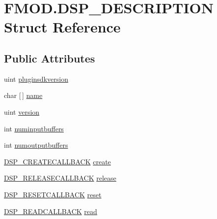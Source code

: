 \hypertarget{struct_f_m_o_d_1_1_d_s_p___d_e_s_c_r_i_p_t_i_o_n}{}\section{F\+M\+O\+D.\+D\+S\+P\+\_\+\+D\+E\+S\+C\+R\+I\+P\+T\+I\+ON Struct Reference}
\label{struct_f_m_o_d_1_1_d_s_p___d_e_s_c_r_i_p_t_i_o_n}
\subsection*{Public Attributes}
\begin{DoxyCompactItemize}
\item 
uint \hyperlink{struct_f_m_o_d_1_1_d_s_p___d_e_s_c_r_i_p_t_i_o_n_ae18fe37961911625380789a2cbbaa82e}{pluginsdkversion}
\item 
char \mbox{[}$\,$\mbox{]} \hyperlink{struct_f_m_o_d_1_1_d_s_p___d_e_s_c_r_i_p_t_i_o_n_abb3197420660275b62c87ee382edf71f}{name}
\item 
uint \hyperlink{struct_f_m_o_d_1_1_d_s_p___d_e_s_c_r_i_p_t_i_o_n_acde54019875ff8a337d7d990e5f72b7f}{version}
\item 
int \hyperlink{struct_f_m_o_d_1_1_d_s_p___d_e_s_c_r_i_p_t_i_o_n_ab402df2846d1fd1a5057a836b52565f9}{numinputbuffers}
\item 
int \hyperlink{struct_f_m_o_d_1_1_d_s_p___d_e_s_c_r_i_p_t_i_o_n_a22eb1dceedf976d48b52b0f4b4da612d}{numoutputbuffers}
\item 
\hyperlink{namespace_f_m_o_d_a197a0679ad072fd7854ff4b449c8ebeb}{D\+S\+P\+\_\+\+C\+R\+E\+A\+T\+E\+C\+A\+L\+L\+B\+A\+CK} \hyperlink{struct_f_m_o_d_1_1_d_s_p___d_e_s_c_r_i_p_t_i_o_n_ab986a42e18ad51980a73501234ab3b22}{create}
\item 
\hyperlink{namespace_f_m_o_d_ac5ab4cf6935c66ff1de18414c1093193}{D\+S\+P\+\_\+\+R\+E\+L\+E\+A\+S\+E\+C\+A\+L\+L\+B\+A\+CK} \hyperlink{struct_f_m_o_d_1_1_d_s_p___d_e_s_c_r_i_p_t_i_o_n_a8cc6474115d808fd6e6c4eac47f899a9}{release}
\item 
\hyperlink{namespace_f_m_o_d_ae25f129e9819b5860c9cef999f6cf68d}{D\+S\+P\+\_\+\+R\+E\+S\+E\+T\+C\+A\+L\+L\+B\+A\+CK} \hyperlink{struct_f_m_o_d_1_1_d_s_p___d_e_s_c_r_i_p_t_i_o_n_ac302059099e4eb89ca16a7690f7c131d}{reset}
\item 
\hyperlink{namespace_f_m_o_d_a84203ed1830a5522384e1c84c8d13c7f}{D\+S\+P\+\_\+\+R\+E\+A\+D\+C\+A\+L\+L\+B\+A\+CK} \hyperlink{struct_f_m_o_d_1_1_d_s_p___d_e_s_c_r_i_p_t_i_o_n_a80ecfc84fbd4d3d6881c4abb1f58a60b}{read}

\end{DoxyCompactItemize}
